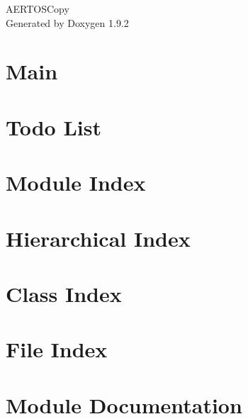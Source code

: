 \documentclass[twoside]{book}
\newcommand{\+}{\discretionary{\mbox{\scriptsize$\hookleftarrow$}}{}{}}
\newcommand{\clearemptydoublepage}{%
    \newpage{\pagestyle{empty}\cleardoublepage}%
  }
\begin{document}
  \raggedbottom
    \hypersetup{pageanchor=false,
                bookmarksnumbered=true,
                pdfencoding=unicode
               }
  \begin{titlepage}
  \vspace*{7cm}
  \begin{center}%
  {\Large AERTOSCopy}\\
  \vspace*{1cm}
  {\large Generated by Doxygen 1.9.2}\\
  \end{center}
  \end{titlepage}
  \clearemptydoublepage
  \tableofcontents
  \clearemptydoublepage
  \hypersetup{pageanchor=true}
\chapter{Main}
\label{_main}

\chapter{Todo List}
\label{todo}

\chapter{Module Index}

\chapter{Hierarchical Index}

\chapter{Class Index}

\chapter{File Index}

\chapter{Module Documentation}









\end{document}

